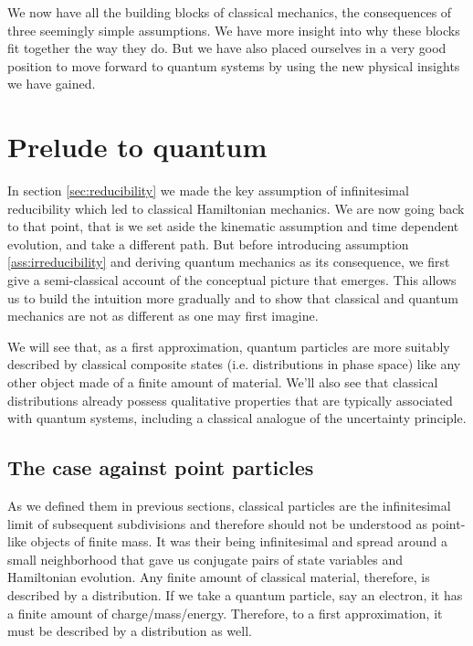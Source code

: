 \documentclass[smallextended]{svjour3}
\numberwithin{equation}{section}
\theoremstyle{definition}
\begin{document}
We now have all the building blocks of classical mechanics, the consequences of three seemingly simple assumptions. We have more insight into why these blocks fit together the way they do. But we have also placed ourselves in a very good position to move forward to quantum systems by using the new physical insights we have gained.

\section{Prelude to quantum}
\label{sec:quantum_prelude}

In section \ref{sec:reducibility} we made the key assumption of infinitesimal reducibility which led to classical Hamiltonian mechanics. We are now going back to that point, that is we set aside the kinematic assumption and time dependent evolution, and take a different path. But before introducing assumption \ref{ass:irreducibility} and deriving quantum mechanics as its consequence, we first give a semi-classical account of the conceptual picture that emerges. This allows us to build the intuition more gradually and to show that classical and quantum mechanics are not as different as one may first imagine.

We will see that, as a first approximation, quantum particles are more suitably described by classical composite states (i.e. distributions in phase space) like any other object made of a finite amount of material. We'll also see that classical distributions already possess qualitative properties that are typically associated with quantum systems, including a classical analogue of the uncertainty principle.

\subsection{The case against point particles}

As we defined them in previous sections, classical particles are the infinitesimal limit of subsequent subdivisions and therefore should not be understood as point-like objects of finite mass. It was their being infinitesimal and spread around a small neighborhood that gave us conjugate pairs of state variables and Hamiltonian evolution. Any finite amount of classical material, therefore, is described by a distribution. If we take a quantum particle, say an electron, it has a finite amount of charge/mass/energy. Therefore, to a first approximation, it must be described by a distribution as well.
\end{document}
